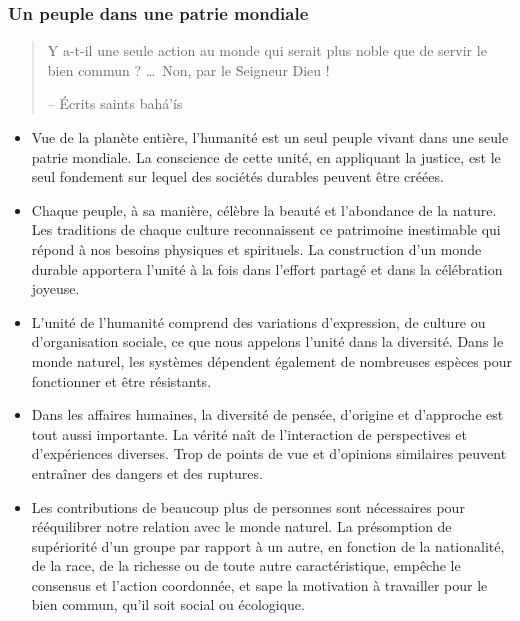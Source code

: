 \documentclass[11pt,xcolor={dvipsnames},hyperref={pdftex,pdfpagemode=UseNone,hidelinks,pdfdisplaydoctitle=true},usepdftitle=false]{beamer}
\begin{document}
\begin{frame}[allowframebreaks=0.8]
  \frametitle{Un peuple dans une patrie mondiale}
  \begin{quote}
    Y a-t-il une seule action au monde qui serait plus noble que de servir le
    bien commun ? \ldots\ Non, par le Seigneur Dieu !

    \raggedleft -- Écrits saints bahá’ís
  \end{quote}
  \begin{itemize}
    \item Vue de la planète entière, l'humanité est un seul peuple vivant dans
      une seule patrie mondiale. La conscience de cette unité, en appliquant la
      justice, est le seul fondement sur lequel des sociétés durables peuvent
      être créées.
    \item Chaque peuple, à sa manière, célèbre la beauté et l'abondance de la
      nature. Les traditions de chaque culture reconnaissent ce patrimoine
      inestimable qui répond à nos besoins physiques et spirituels. La
      construction d'un monde durable apportera l'unité à la fois dans l'effort
      partagé et dans la célébration joyeuse.
    \item L'unité de l'humanité comprend des variations d'expression, de culture
      ou d'organisation sociale, ce que nous appelons l'unité dans la diversité.
      Dans le monde naturel, les systèmes dépendent également de nombreuses
      espèces pour fonctionner et être résistants.
    \item Dans les affaires humaines, la diversité de pensée, d'origine et
      d'approche est tout aussi importante. La vérité naît de l'interaction de
      perspectives et d'expériences diverses. Trop de points de vue et
      d'opinions similaires peuvent entraîner des dangers et des ruptures.
    \item Les contributions de beaucoup plus de personnes sont nécessaires pour
      rééquilibrer notre relation avec le monde naturel. La présomption de
      supériorité d'un groupe par rapport à un autre, en fonction de la
      nationalité, de la race, de la richesse ou de toute autre caractéristique,
      empêche le consensus et l'action coordonnée, et sape la motivation à
      travailler pour le bien commun, qu'il soit social ou écologique.
  \end{itemize}
\end{frame}
\end{document}
